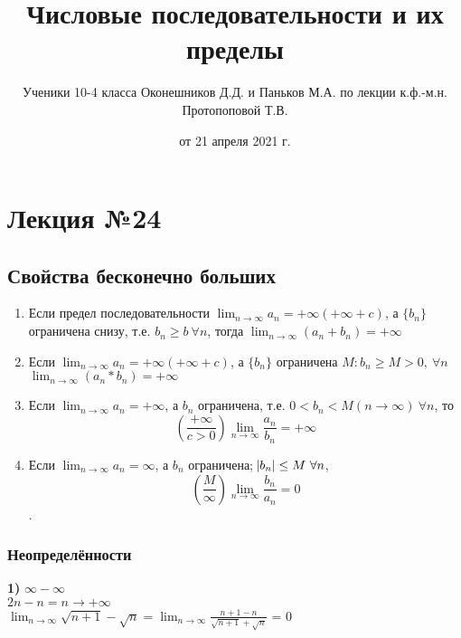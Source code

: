 \documentclass{article}
\begin{document}
    \title{Числовые последовательности и их пределы}
    \author{Ученики 10-4 класса Оконешников Д.Д. и Паньков М.А. по лекции к.ф.-м.н. Протопоповой Т.В.}
    \date{от 21 апреля 2021 г.}
    \maketitle

    \section{Лекция №24}
    \subsection{Свойства бесконечно больших}

    \begin{enumerate}
        \item Если предел последовательности \( \lim_{n \rightarrow \infty }a_n = + \infty \)\( (+\infty + c) \), а \( \{b_n\} \) ограничена снизу, т.е. \( b_n \geq b\ \forall n \), тогда \(\lim_{n \rightarrow \infty}{(a_n + b_n)} = +\infty\)
       
        \item Если \( \lim_{n \rightarrow \infty }a_n = + \infty \)\( (+\infty + c) \), а \( \{b_n\} \) ограничена \( M: b_n \geq M > 0,\ \forall n \)
    \(\lim_{n \rightarrow \infty}{(a_n * b_n)} = +\infty\)

        \item Если \( \lim_{n \rightarrow \infty }a_n = +\infty \), а \( b_n \) ограничена, т.е. \( 0 < b_n < M (n \rightarrow \infty)\ \forall n \), то \[ (\frac{+\infty}{c > 0}) \lim_{n \rightarrow \infty}{\frac{a_n}{b_n}} = +\infty\]
    
        \item Если \(\lim_{n \rightarrow \infty}{a_n} = \infty\), а \(b_n\) ограничена; \(\abs{b_n} \leq M\  \forall n\), \[ (\frac{M}{\infty}) \lim_{n \rightarrow \infty }\frac{b_n}{a_n} = 0 \].
    \end{enumerate}

    \subsubsection{Неопределённости}

    \textbf{1)} \(\infty - \infty\)
    \\ \(2n - n = n \rightarrow +\infty\)
    \\ \(\lim_{n \rightarrow \infty}{\sqrt{n+1} - \sqrt{n}} = \lim_{n \rightarrow \infty}{\frac{n+1-n}{\sqrt{n+1}+\sqrt{n}}}\) = 0
\end{document}

